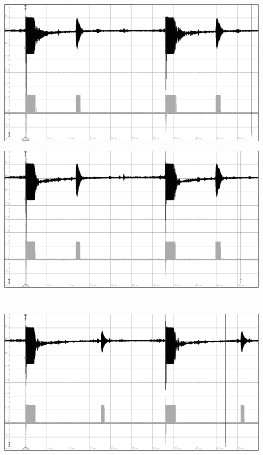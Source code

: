\begin{minipage}{0.46\textwidth}
\includegraphics[width=1\textwidth%
]{Abbildungen/MessungenP2/15V/2m.PNG}
\end{minipage}\qquad
\begin{minipage}{0.46\textwidth}
\includegraphics[width=1\textwidth%
]{Abbildungen/MessungenP2/20V/2m.PNG}
\end{minipage}\\
\begin{minipage}{0.46\textwidth}
\includegraphics[width=1\textwidth%
]{Abbildungen/MessungenP2/15V/3m.PNG}
\end{minipage}\qquad

